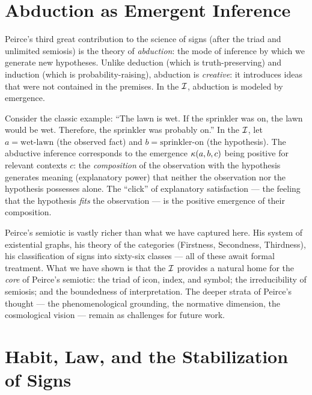 \section{Abduction as Emergent Inference}

Peirce's third great contribution to the science of signs (after the
triad and unlimited semiosis) is the theory of \emph{abduction}: the
mode of inference by which we generate new hypotheses. Unlike deduction
(which is truth-preserving) and induction (which is probability-raising),
abduction is \emph{creative}: it introduces ideas that were not
contained in the premises. In the $\mathcal{I}$, abduction is modeled by
emergence.

\begin{example}
Consider the classic example: ``The lawn is wet. If the sprinkler was
on, the lawn would be wet. Therefore, the sprinkler was probably on.''
In the $\mathcal{I}$, let $a = \text{wet-lawn}$ (the observed fact) and
$b = \text{sprinkler-on}$ (the hypothesis). The abductive inference
corresponds to the emergence $\kappa(a, b, c)$ being positive for
relevant contexts $c$: the \emph{composition} of the observation with
the hypothesis generates meaning (explanatory power) that neither the
observation nor the hypothesis possesses alone. The ``click'' of
explanatory satisfaction --- the feeling that the hypothesis
\emph{fits} the observation --- is the positive emergence of their
composition.
\end{example}

\begin{remark}
Peirce's semiotic is vastly richer than what we have captured here.
His system of existential graphs, his theory of the categories
(Firstness, Secondness, Thirdness), his classification of signs
into sixty-six classes --- all of these await formal treatment. What
we have shown is that the $\mathcal{I}$ provides a natural home for the
\emph{core} of Peirce's semiotic: the triad of icon, index, and
symbol; the irreducibility of semiosis; and the boundedness of
interpretation. The deeper strata of Peirce's thought --- the
phenomenological grounding, the normative dimension, the cosmological
vision --- remain as challenges for future work.
\end{remark}

\section{Habit, Law, and the Stabilization of Signs}

